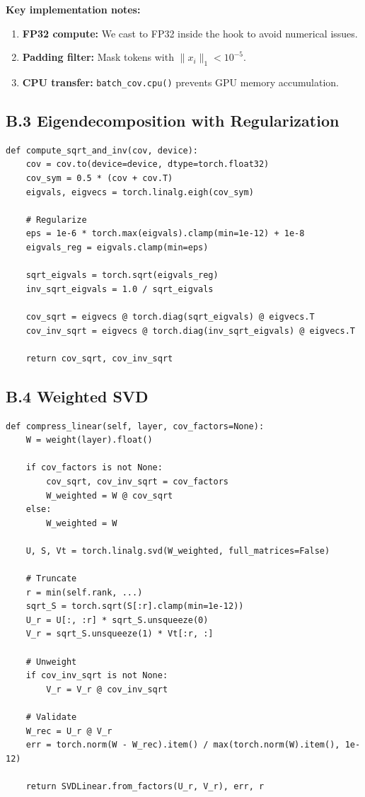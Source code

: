 \textbf{Key implementation notes:}

\begin{enumerate}
\item \textbf{FP32 compute:} We cast to FP32 inside the hook to avoid numerical issues.
\item \textbf{Padding filter:} Mask tokens with $\|x_i\|_1 < 10^{-5}$.
\item \textbf{CPU transfer:} \texttt{batch\_cov.cpu()} prevents GPU memory accumulation.

\end{enumerate}
\subsection{B.3 Eigendecomposition with Regularization}

\begin{lstlisting}
def compute_sqrt_and_inv(cov, device):
    cov = cov.to(device=device, dtype=torch.float32)
    cov_sym = 0.5 * (cov + cov.T)
    eigvals, eigvecs = torch.linalg.eigh(cov_sym)
    
    # Regularize
    eps = 1e-6 * torch.max(eigvals).clamp(min=1e-12) + 1e-8
    eigvals_reg = eigvals.clamp(min=eps)
    
    sqrt_eigvals = torch.sqrt(eigvals_reg)
    inv_sqrt_eigvals = 1.0 / sqrt_eigvals
    
    cov_sqrt = eigvecs @ torch.diag(sqrt_eigvals) @ eigvecs.T
    cov_inv_sqrt = eigvecs @ torch.diag(inv_sqrt_eigvals) @ eigvecs.T
    
    return cov_sqrt, cov_inv_sqrt
\end{lstlisting}

\subsection{B.4 Weighted SVD}

\begin{lstlisting}
def compress_linear(self, layer, cov_factors=None):
    W = weight(layer).float()
    
    if cov_factors is not None:
        cov_sqrt, cov_inv_sqrt = cov_factors
        W_weighted = W @ cov_sqrt
    else:
        W_weighted = W
    
    U, S, Vt = torch.linalg.svd(W_weighted, full_matrices=False)
    
    # Truncate
    r = min(self.rank, ...)
    sqrt_S = torch.sqrt(S[:r].clamp(min=1e-12))
    U_r = U[:, :r] * sqrt_S.unsqueeze(0)
    V_r = sqrt_S.unsqueeze(1) * Vt[:r, :]
    
    # Unweight
    if cov_inv_sqrt is not None:
        V_r = V_r @ cov_inv_sqrt
    
    # Validate
    W_rec = U_r @ V_r
    err = torch.norm(W - W_rec).item() / max(torch.norm(W).item(), 1e-12)
    
    return SVDLinear.from_factors(U_r, V_r), err, r
\end{lstlisting}

